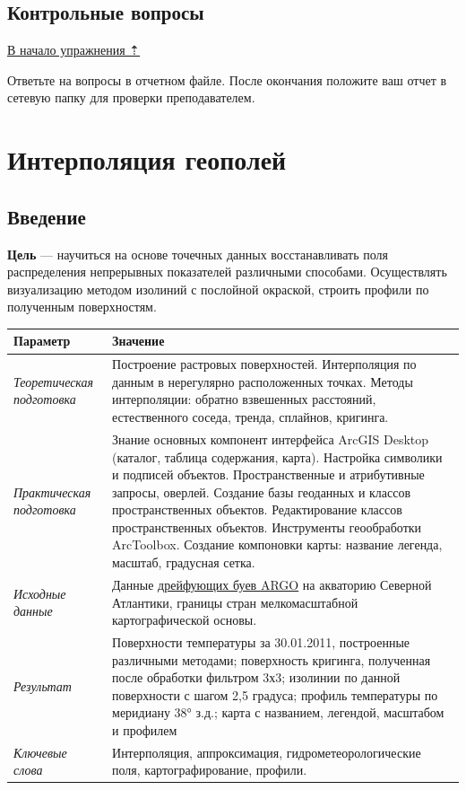 \documentclass[]{book}
\theoremstyle{definition}
\theoremstyle{definition}
\theoremstyle{definition}
\theoremstyle{remark}
\begin{document}
\hypertarget{density-analysis-questions}{%
\section{Контрольные вопросы}\label{density-analysis-questions}}

\protect\hyperlink{density-analysis}{В начало упражнения ⇡}

Ответьте на вопросы в отчетном файле. После окончания положите ваш отчет
в сетевую папку для проверки преподавателем.

\hypertarget{interpolation}{%
\chapter{Интерполяция геополей}\label{interpolation}}

\hypertarget{interpolation-intro}{%
\section{Введение}\label{interpolation-intro}}

\textbf{Цель} --- научиться на основе точечных данных восстанавливать
поля распределения непрерывных показателей различными способами.
Осуществлять визуализацию методом изолиний с послойной окраской, строить
профили по полученным поверхностям.

\begin{longtable}[]{@{}ll@{}}
\toprule
Параметр & Значение\tabularnewline
\midrule
\endhead
\emph{Теоретическая подготовка} & Построение растровых поверхностей.
Интерполяция по данным в нерегулярно расположенных точках. Методы
интерполяции: обратно взвешенных расстояний, естественного соседа,
тренда, сплайнов, кригинга.\tabularnewline
\emph{Практическая подготовка} & Знание основных компонент интерфейса
ArcGIS Desktop (каталог, таблица содержания, карта). Настройка символики
и подписей объектов. Пространственные и атрибутивные запросы, оверлей.
Создание базы геоданных и классов пространственных объектов.
Редактирование классов пространственных объектов. Инструменты
геообработки ArcToolbox. Создание компоновки карты: название легенда,
масштаб, градусная сетка.\tabularnewline
\emph{Исходные данные} & Данные
\href{http://www.argo.ucsd.edu}{дрейфующих буев ARGO} на акваторию
Северной Атлантики, границы стран мелкомасштабной картографической
основы.\tabularnewline
\emph{Результат} & Поверхности температуры за 30.01.2011, построенные
различными методами; поверхность кригинга, полученная после обработки
фильтром 3х3; изолинии по данной поверхности с шагом 2,5 градуса;
профиль температуры по меридиану 38° з.д.; карта с названием, легендой,
масштабом и профилем\tabularnewline
\emph{Ключевые слова} & Интерполяция, аппроксимация,
гидрометеорологические поля, картографирование, профили.\tabularnewline
\bottomrule
\end{longtable}
\end{document}
